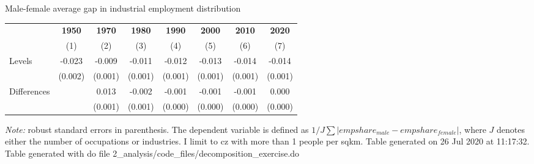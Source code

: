 \begin{center}
\begin{threeparttable}[!h]
\caption{Male-female average gap in industrial employment distribution}
\begin{tabular}{lccccccc}
\toprule
\toprule
&\multicolumn{1}{c}{\textbf{1950}}&\multicolumn{1}{c}{\textbf{1970}}&\multicolumn{1}{c}{\textbf{1980}}&\multicolumn{1}{c}{\textbf{1990}}&\multicolumn{1}{c}{\textbf{2000}}&\multicolumn{1}{c}{\textbf{2010}}&\multicolumn{1}{c}{\textbf{2020}} \\
\textbf{}&\multicolumn{1}{c}{(1)}&\multicolumn{1}{c}{(2)}&\multicolumn{1}{c}{(3)}&\multicolumn{1}{c}{(4)}&\multicolumn{1}{c}{(5)}&\multicolumn{1}{c}{(6)}&\multicolumn{1}{c}{(7)} \\
\midrule
Levels              &      -0.023\sym{***}&      -0.009\sym{***}&      -0.011\sym{***}&      -0.012\sym{***}&      -0.013\sym{***}&      -0.014\sym{***}&      -0.014\sym{***}\\
                    &     (0.002)         &     (0.001)         &     (0.001)         &     (0.001)         &     (0.001)         &     (0.001)         &     (0.001)         \\
Differences         &                     &       0.013\sym{***}&      -0.002\sym{*}  &      -0.001         &      -0.001         &      -0.001\sym{**} &       0.000         \\
                    &                     &     (0.001)         &     (0.001)         &     (0.000)         &     (0.000)         &     (0.000)         &     (0.000)         \\
\bottomrule
\bottomrule
\end{tabular}
\begin{tablenotes}
\item \footnotesize \textit{Note:} robust standard errors in parenthesis. The dependent variable is defined as $1/J \sum | empshare_{male}- empshare_{female}| $, where $ J $ denotes either the number of occupations or industries. I limit to cz with more than 1 people per sqkm. Table generated on 26 Jul 2020 at 11:17:32. Table generated with do file 2\_analysis/code\_files/decomposition\_exercise.do
\end{tablenotes}
\end{threeparttable}
\end{center}
